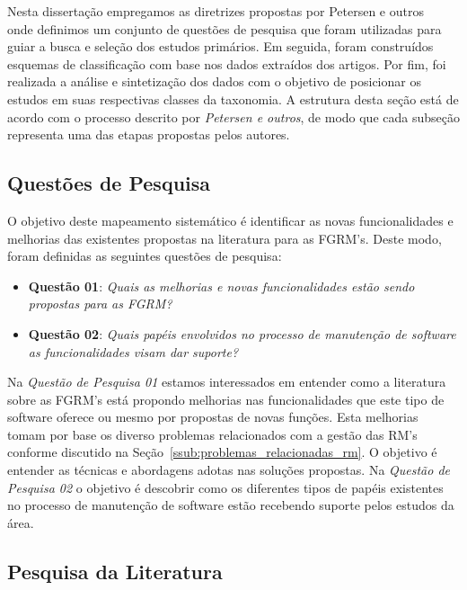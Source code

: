 Nesta dissertação empregamos as diretrizes propostas por Petersen e
outros~\cite{Petersen2008} onde definimos um conjunto de questões de pesquisa
que foram utilizadas para guiar a busca e seleção dos estudos primários. Em
seguida, foram construídos esquemas de classificação com base nos dados
extraídos dos artigos. Por fim, foi realizada a análise e sintetização dos dados
com o objetivo de posicionar os estudos em suas respectivas classes da
taxonomia. A estrutura desta seção está de acordo com o processo descrito por
\textit{Petersen e outros}, de modo que cada subseção representa uma das etapas
propostas pelos autores.

\subsection{Questões de Pesquisa}
\label{subsec:map-questoes-de-pesquisa}

O objetivo deste mapeamento sistemático é identificar as novas funcionalidades e
melhorias das existentes propostas na literatura para as FGRM's. Deste modo,
foram definidas as seguintes questões de pesquisa:

\begin{itemize}
	\item \textbf{Questão 01}: \textit{Quais as melhorias e novas
			funcionalidades estão sendo propostas para as FGRM?}
	\item \textbf{Questão 02}: \textit{Quais papéis envolvidos no processo de
			manutenção de software as funcionalidades visam dar suporte?}
\end{itemize}

Na \textit{Questão de Pesquisa 01} estamos interessados em entender como a
literatura sobre as FGRM's está propondo melhorias nas funcionalidades que este
tipo de software oferece ou mesmo por propostas de novas funções. Esta melhorias
tomam por base os diverso problemas relacionados com a gestão das RM's conforme
discutido na Seção~\ref{ssub:problemas_relacionadas_rm}. O objetivo é entender
as técnicas e abordagens adotas nas soluções propostas. Na \textit{Questão de
	Pesquisa 02} o objetivo é descobrir como os diferentes tipos de papéis
existentes no processo de manutenção de software estão recebendo suporte pelos
estudos da área.

\subsection{Pesquisa da Literatura}
\label{subsec:map-pesquisa-literatura}

